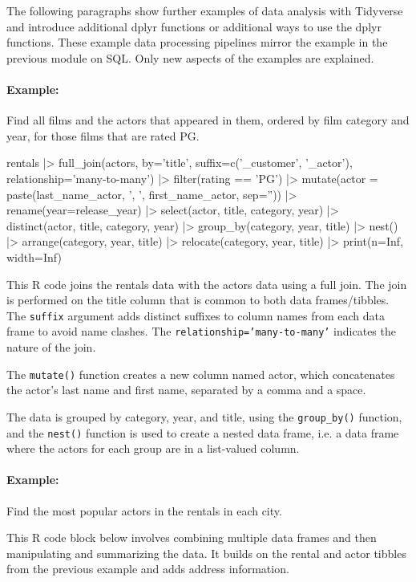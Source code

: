 The following paragraphs show further examples of data analysis with Tidyverse and introduce additional dplyr functions or additional ways to use the dplyr functions. These example data processing pipelines mirror the example in the previous module on SQL. Only new aspects of the examples are explained.

\paragraph*{Example:} Find all films and the actors that appeared in them, ordered by film category and year, for those films that are rated PG.

\begin{Rcode}
rentals |> 
  full_join(actors, by='title', 
    suffix=c('_customer', '_actor'), 
    relationship='many-to-many') |>
  filter(rating == 'PG') |>
  mutate(actor = 
    paste(last_name_actor, ', ', first_name_actor, sep='')) |>
  rename(year=release_year) |>
  select(actor, title, category, year) |>
  distinct(actor, title, category, year) |>
  group_by(category, year, title) |> 
  nest() |>
  arrange(category, year, title) |>
  relocate(category, year, title) |>
  print(n=Inf, width=Inf)
\end{Rcode}

This R code joins the rentals data with the actors data using a full join. The join is performed on the title column that is common to both data frames/tibbles. The \texttt{suffix} argument adds distinct suffixes to column names from each data frame to avoid name clashes. The \texttt{relationship='many-to-many'} indicates the nature of the join.

The \texttt{mutate()} function creates a new column named actor, which concatenates the actor's last name and first name, separated by a comma and a space.

The data is grouped by category, year, and title, using the \texttt{group\_by()} function, and the \texttt{nest()} function is used to create a nested data frame, i.e. a data frame where the actors for each group are in a list-valued column.

\paragraph*{Example:} Find the most popular actors in the rentals in each city.

This R code block below involves combining multiple data frames and then manipulating and summarizing the data. It builds on the rental and actor tibbles from the previous example and adds address information.


